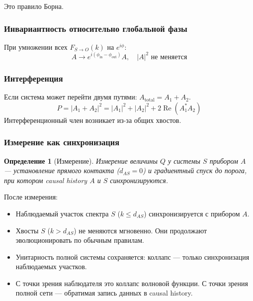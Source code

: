 \documentclass[12pt,a4paper]{article}
\newtheorem{definition}{Определение}[section]
\begin{document}
Это правило Борна.

\subsubsection{Инвариантность относительно глобальной фазы}

При умножении всех $F_{S \to O}(k)$ на $e^{i\phi}$:
\begin{equation}
    A \to e^{i(\phi_{\text{in}} - \phi_{\text{out}})} A, \quad |A|^2 \text{ не меняется}
\end{equation}

\subsubsection{Интерференция}

Если система может перейти двумя путями: $A_{\text{total}} = A_1 + A_2$.
\begin{equation}
    P = |A_1 + A_2|^2 = |A_1|^2 + |A_2|^2 + 2 \operatorname{Re}(A_1^* A_2)
\end{equation}
Интерференционный член возникает из-за общих хвостов.

\subsubsection{Измерение как синхронизация}

\begin{definition}[Измерение]
Измерение величины $Q$ у системы $S$ прибором $A$ --- установление прямого контакта ($d_{AS} = 0$) и градиентный спуск до порога, при котором causal history $A$ и $S$ синхронизируются.
\end{definition}

После измерения:
\begin{itemize}
    \item Наблюдаемый участок спектра $S$ ($k \leq d_{AS}$) синхронизируется с прибором $A$.
    \item Хвосты $S$ ($k > d_{AS}$) не меняются мгновенно. Они продолжают эволюционировать по обычным правилам.
    \item Унитарность полной системы сохраняется: коллапс --- только синхронизация наблюдаемых участков.
    \item С точки зрения наблюдателя это коллапс волновой функции. С точки зрения полной сети --- обратимая запись данных в causal history.
\end{itemize}

\end{document}
